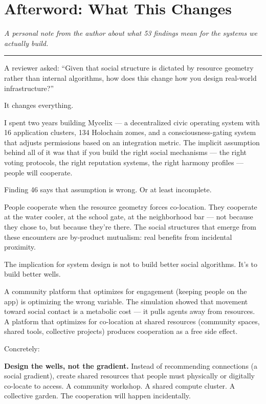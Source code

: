 \chapter{Afterword: What This Changes}\label{afterword-what-this-changes}

\emph{A personal note from the author about what 53 findings mean for the systems we actually build.}

\begin{center}\rule{0.5\linewidth}{0.5pt}\end{center}

A reviewer asked: ``Given that social structure is dictated by resource geometry rather than internal algorithms, how does this change how you design real-world infrastructure?''

It changes everything.

I spent two years building Mycelix --- a decentralized civic operating system with 16 application clusters, 134 Holochain zomes, and a consciousness-gating system that adjusts permissions based on an integration metric. The implicit assumption behind all of it was that if you build the right social mechanisms --- the right voting protocols, the right reputation systems, the right harmony profiles --- people will cooperate.

Finding 46 says that assumption is wrong. Or at least incomplete.

People cooperate when the resource geometry forces co-location. They cooperate at the water cooler, at the school gate, at the neighborhood bar --- not because they chose to, but because they're there. The social structures that emerge from these encounters are by-product mutualism: real benefits from incidental proximity.

The implication for system design is not to build better social algorithms. It's to build better wells.

A community platform that optimizes for engagement (keeping people on the app) is optimizing the wrong variable. The simulation showed that movement toward social contact is a metabolic cost --- it pulls agents away from resources. A platform that optimizes for co-location at shared resources (community spaces, shared tools, collective projects) produces cooperation as a free side effect.

Concretely:

\textbf{Design the wells, not the gradient.} Instead of recommending connections (a social gradient), create shared resources that people must physically or digitally co-locate to access. A community workshop. A shared compute cluster. A collective garden. The cooperation will happen incidentally.

